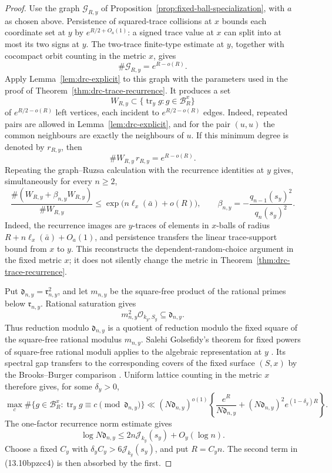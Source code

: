 \documentclass[11pt,reqno]{amsart}
\theoremstyle{definition}
\theoremstyle{remark}
\newcommand{\cO}{\mathcal O}
\newcommand{\Tr}{\operatorname{tr}}
\begin{document}
\begin{proof}
Use the graph \(\mathcal G_{R,y}\) of
Proposition~\ref{prop:fixed-ball-specialization}, with \(a\) as chosen
above.  Persistence of squared-trace collisions at \(x\) bounds each
coordinate set at \(y\) by \(e^{R/2+O_a(1)}\): a signed trace value at
\(x\) can split into at most its two signs at \(y\).  The two-trace
finite-type estimate at \(y\), together with cocompact orbit counting in
the metric \(x\), gives
\[
 \#\mathcal G_{R,y}=e^{R-o(R)}.
\tag{13.10bpzcc1}
\]
Apply Lemma~\ref{lem:drc-explicit} to this graph with the parameters used
in the proof of Theorem~\ref{thm:drc-trace-recurrence}.  It produces a set
\[
 W_{R,y}\subset\{\Tr_y g:g\in\mathcal B_R^x\}
\]
of \(e^{R/2-o(R)}\) left vertices, each incident to
\(e^{R/2-o(R)}\) edges.  Indeed, repeated pairs are allowed in
Lemma~\ref{lem:drc-explicit}, and for the pair \((u,u)\) the common
neighbours are exactly the neighbours of \(u\).  If this minimum degree is
denoted by \(r_{R,y}\), then
\[
 \#W_{R,y}\,r_{R,y}=e^{R-o(R)}.
\tag{13.10bpzcc1a}
\]
Repeating the graph--Ruzsa calculation with the
recurrence identities at \(y\) gives, simultaneously for every \(n\ge2\),
\[
 \frac{\#(W_{R,y}+\beta_{n,y}W_{R,y})}{\#W_{R,y}}
 \le\exp\bigl(n\ell_x(\bar a)+o(R)\bigr),
 \qquad
 \beta_{n,y}=-\frac{q_{n-1}(s_y)^2}{q_n(s_y)^2}.
\tag{13.10bpzcc2}
\]
Indeed, the recurrence images are \(y\)-traces of elements in \(x\)-balls
of radius \(R+n\ell_x(\bar a)+O_a(1)\), and persistence transfers the
linear trace-support bound from \(x\) to \(y\).  This reconstructs the
dependent-random-choice argument in the fixed metric \(x\); it does not
silently change the metric in Theorem~\ref{thm:drc-trace-recurrence}.

Put \(\mathfrak d_{n,y}=\mathfrak r_{n,y}^2\), and let \(m_{n,y}\) be the
square-free product of the rational primes below \(\mathfrak r_{n,y}\).
Rational saturation gives
\[
 m_{n,y}^2\cO_{k_y,S_y}\subseteq\mathfrak d_{n,y}.
\tag{13.10bpzcc3}
\]
Thus reduction modulo \(\mathfrak d_{n,y}\) is a quotient of reduction
modulo the fixed square of the square-free rational modulus \(m_{n,y}\).
Salehi Golsefidy's theorem for fixed powers of square-free rational moduli
applies to the algebraic representation at \(y\)
\cite{SalehiSuperII}.  Its spectral gap transfers to the corresponding covers of the
fixed surface \((S,x)\) by the Brooks--Burger comparison
\cite{BrooksTower,Burger}.  Uniform lattice counting in the metric \(x\)
therefore gives, for some \(\delta_y>0\),
\[
 \max_c\#\{g\in\mathcal B_R^x:
   \Tr_y g\equiv c\pmod{\mathfrak d_{n,y}}\}
 \ll
 (N\mathfrak d_{n,y})^{o(1)}
 \left\{
 \frac{e^R}{N\mathfrak d_{n,y}}
 +(N\mathfrak d_{n,y})^2e^{(1-\delta_y)R}
 \right\}.
\tag{13.10bpzcc4}
\]
The one-factor recurrence norm estimate gives
\[
 \log N\mathfrak d_{n,y}
 \le2n\mathcal J_{k_y}(s_y)+O_y(\log n).
\]
Choose a fixed \(C_y\) with
\(\delta_yC_y>6\mathcal J_{k_y}(s_y)\), and put \(R=C_yn\).  The second
term in (13.10bpzcc4) is then absorbed by the first.


\end{proof}
\end{document}
